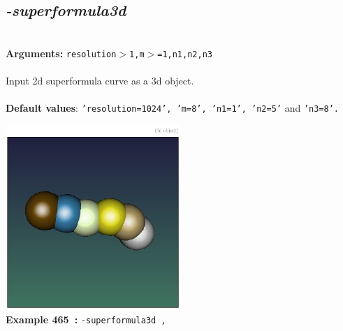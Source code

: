 \documentclass[a4paper,11pt,twoside]{book}
\begin{document}
\subsection{\emph{-superformula3d} }\vspace*{-0.5em}
~\\\textbf{Arguments: } 
{\small \texttt{resolution$>$1,m$>$=1,n1,n2,n3}}\\~\\
Input 2d superformula curve as a 3d object.
~\\~\\\textbf{Default values}: {\small \texttt{'resolution=1024', 'm=8', 'n1=1', 'n2=5'} and \texttt{'n3=8'.}}
\begin{center}\includegraphics[keepaspectratio=true,height=7cm,width=\textwidth]{img/gmic_def465.jpg}\\
{\footnotesize \textbf{Example 465~:} \texttt{-superformula3d ,}}
\end{center}
\end{document}
